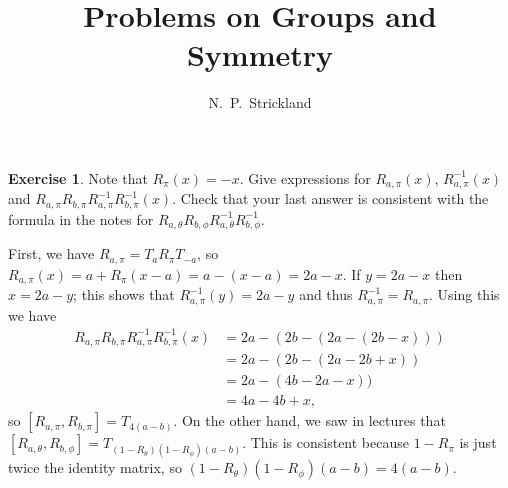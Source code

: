 \documentclass{amsart}
\renewcommand{\:}{\colon}
\newcommand{\tht}       {\theta}
\theoremstyle{definition}
\newtheorem{exercise}{Exercise}
\newenvironment{solution}{{\noindent\bf Solution:}}{}
\begin{document}
\title{Problems on Groups and Symmetry}
\author{N.~P.~Strickland}

\maketitle 

\begin{exercise}
 Note that $R_\pi(x)=-x$.  Give expressions for $R_{a,\pi}(x)$,
 $R_{a,\pi}^{-1}(x)$ and
 $R_{a,\pi}R_{b,\pi}R_{a,\pi}^{-1}R_{b,\pi}^{-1}(x)$.  Check that your
 last answer is consistent with the formula in the notes for
 $R_{a,\tht}R_{b,\phi}R_{a,\tht}^{-1}R_{b,\phi}^{-1}$. 
\end{exercise}
\begin{solution}
 First, we have $R_{a,\pi}=T_aR_\pi T_{-a}$, so
 $R_{a,\pi}(x)=a+R_\pi(x-a)=a-(x-a)=2a-x$.  If $y=2a-x$ then $x=2a-y$;
 this shows that $R_{a,\pi}^{-1}(y)=2a-y$ and thus
 $R_{a,\pi}^{-1}=R_{a,\pi}$.  Using this we have
 \begin{align*}
  R_{a,\pi}R_{b,\pi}R_{a,\pi}^{-1}R_{b,\pi}^{-1}(x) &=
     2a-(2b-(2a-(2b-x))) \\
  &= 2a-(2b-(2a-2b+x)) \\
  &= 2a-(4b-2a-x)) \\
  &= 4a-4b+x,
 \end{align*}
 so $[R_{a,\pi},R_{b,\pi}]=T_{4(a-b)}$.  On the other hand, we saw in
 lectures that
 $[R_{a,\tht},R_{b,\phi}]=T_{(1-R_\tht)(1-R_\phi)(a-b)}$.  This is
 consistent because $1-R_\pi$ is just twice the identity matrix, so
 $(1-R_\tht)(1-R_\phi)(a-b)=4(a-b)$.
\end{solution}
\end{document}
